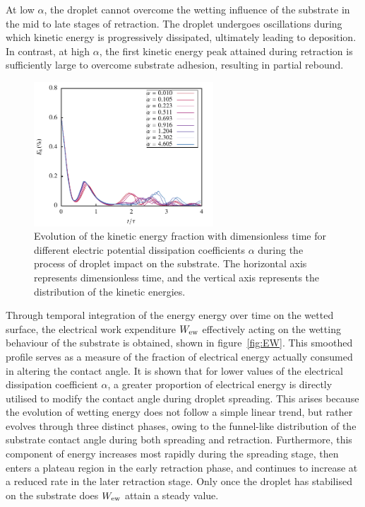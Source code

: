 \documentclass[lineno]{cls/jfm}
\begin{document}
At low $\alpha$, the droplet cannot overcome the wetting influence of the substrate in the mid to late stages of retraction. The droplet undergoes oscillations during which kinetic energy is progressively dissipated, ultimately leading to deposition. In contrast, at high $\alpha$, the first kinetic energy peak attained during retraction is sufficiently large to overcome substrate adhesion, resulting in partial rebound.

 \begin{figure}
  \centerline{\includegraphics[width=0.6\textwidth]{fig/dropEK.pdf}}
  \caption{Evolution of the kinetic energy fraction with dimensionless time for different electric potential dissipation coefficients $\alpha$ during the process of droplet impact on the substrate. The horizontal axis represents dimensionless time, and the vertical axis represents the distribution of the kinetic energies.}
 \label{fig:EK}
 \end{figure}

 Through temporal integration of the energy energy over time on the wetted surface, the electrical work expenditure $W_{\rm ew}$ effectively acting on the wetting behaviour of the substrate is obtained, shown in figure~\ref{fig:EW}. This smoothed profile serves as a measure of the fraction of electrical energy actually consumed in altering the contact angle. It is shown that for lower values of the electrical dissipation coefficient $\alpha$, a greater proportion of electrical energy is directly utilised to modify the contact angle during droplet spreading. This arises because the evolution of wetting energy does not follow a simple linear trend, but rather evolves through three distinct phases, owing to the funnel-like distribution of the substrate contact angle during both spreading and retraction. Furthermore, this component of energy increases most rapidly during the spreading stage, then enters a plateau region in the early retraction phase, and continues to increase at a reduced rate in the later retraction stage. Only once the droplet has stabilised on the substrate does $W_{\rm ew}$ attain a steady value.
\end{document}
